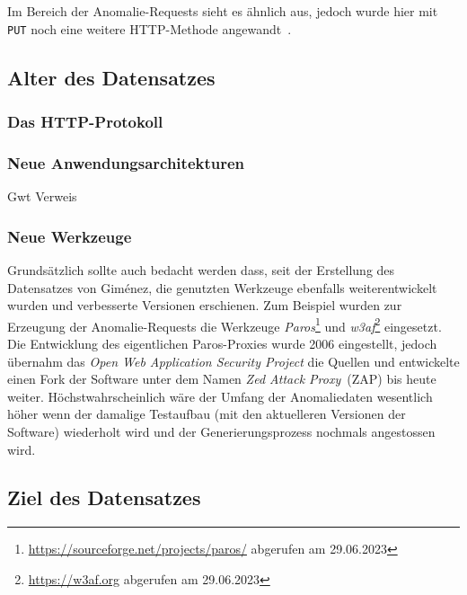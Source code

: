 
Im Bereich der Anomalie-Requests sieht es ähnlich aus, jedoch wurde hier mit \verb=PUT= noch eine weitere HTTP-Methode angewandt~\cite{csic2010}. 

\subsection{Alter des Datensatzes}

\subsubsection{Das HTTP-Protokoll}

\subsubsection{Neue Anwendungsarchitekturen}


Gwt Verweis\cite{kozik2019}

\subsubsection{Neue Werkzeuge}

Grundsätzlich sollte auch bedacht werden dass, seit der Erstellung des Datensatzes von Giménez, die genutzten Werkzeuge ebenfalls weiterentwickelt wurden und verbesserte Versionen erschienen. Zum Beispiel wurden zur Erzeugung der Anomalie-Requests die Werkzeuge \emph{Paros}\footnote{\url{https://sourceforge.net/projects/paros/} abgerufen am 29.06.2023} und \emph{w3af}\footnote{\url{https://w3af.org} abgerufen am 29.06.2023} eingesetzt. Die Entwicklung des eigentlichen Paros-Proxies wurde 2006 eingestellt, jedoch übernahm das \emph{Open Web Application Security Project} die Quellen und entwickelte einen Fork der Software unter dem Namen \emph{Zed Attack Proxy}~(ZAP) bis heute weiter. Höchstwahrscheinlich wäre der Umfang der Anomaliedaten wesentlich höher wenn der damalige Testaufbau (mit den aktuelleren Versionen der Software) wiederholt wird und der Generierungsprozess nochmals angestossen wird.
  
\subsection{Ziel des Datensatzes}

